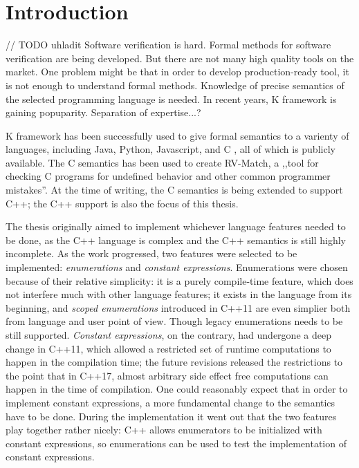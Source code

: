 \documentclass{fithesis3}
\begin{document}
\chapter{Introduction}

// TODO uhladit
Software verification is hard. Formal methods for software verification are being developed. But there are not many high quality tools on the market. One problem might be that in order to develop production-ready tool, it is not enough to understand formal methods. Knowledge of precise semantics of the selected programming language is needed. In recent years, K framework is gaining popuparity. Separation of expertise...?

K framework has been successfully used to give formal semantics to a varienty of languages, including Java\cite{bogdanas-rosu-2015-popl}, Python, Javascript\cite{park-stefanescu-rosu-2015-pldi}, and C \cite{ellison-2012-thesis}\cite{hathhorn-ellison-rosu-2015-pldi,}, all of which is publicly available. The C semantics has been used to create RV-Match\cite{guth-hathhorn-saxena-rosu-2016-cav}, a ,,tool for checking C programs for
undefined behavior and other common programmer mistakes''.  At the time of writing, the C semantics is being extended to support C++; the C++ support is also the focus of this thesis.

The thesis originally aimed to implement whichever language features needed to be done, as the C++ language is complex and the C++ semantics is still highly incomplete. As the work progressed, two features were selected to be implemented: \textit{enumerations} and \textit{constant expressions}. Enumerations were chosen because of their relative simplicity: it is a purely compile-time feature, which does not interfere much with other language features; it exists in the language from its beginning, and \textit{scoped enumerations} introduced in C++11 are even simplier both from language and user point of view. Though legacy enumerations needs to be still supported. \textit{Constant expressions}, on the contrary, had undergone a deep change in C++11, which allowed a restricted set of runtime computations to happen in the compilation time; the future revisions released the restrictions to the point that in C++17, almost arbitrary side effect free computations can happen in the time of compilation. One could reasonably expect that in order to implement constant expressions, a more fundamental change to the semantics have to be done.
 During the implementation it went out that the two features play together rather nicely: C++ allows enumerators to be initialized with constant expressions, so enumerations can be used to test the implementation of constant expressions.
\end{document}

